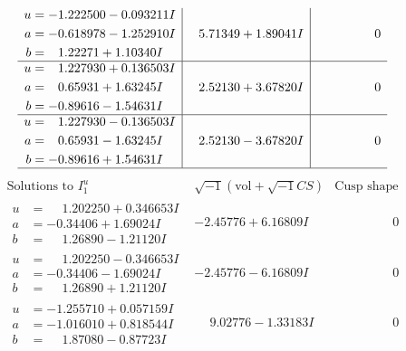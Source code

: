 \documentclass[1p]{elsarticle_modified}
\theoremstyle{definition}
\newcommand{\I}{\sqrt{-1}}
\begin{document}
$$\begin{array}{c|c|c}
\begin{aligned}
u &= -1.222500 - 0.093211 I \\
a &= -0.618978 - 1.252910 I \\
b &= \phantom{-}1.22271 + 1.10340 I\end{aligned}
 & \phantom{-}5.71349 + 1.89041 I & \phantom{-0.000000 } 0 \\ \hline\begin{aligned}
u &= \phantom{-}1.227930 + 0.136503 I \\
a &= \phantom{-}0.65931 + 1.63245 I \\
b &= -0.89616 - 1.54631 I\end{aligned}
 & \phantom{-}2.52130 + 3.67820 I & \phantom{-0.000000 } 0 \\ \hline\begin{aligned}
u &= \phantom{-}1.227930 - 0.136503 I \\
a &= \phantom{-}0.65931 - 1.63245 I \\
b &= -0.89616 + 1.54631 I\end{aligned}
 & \phantom{-}2.52130 - 3.67820 I & \phantom{-0.000000 } 0\\
 \hline 
 \end{array}$$\newpage$$\begin{array}{c|c|c}  
\text{Solutions to }I^u_{1}& \I (\text{vol} + \sqrt{-1}CS) & \text{Cusp shape}\\
 \hline 
\begin{aligned}
u &= \phantom{-}1.202250 + 0.346653 I \\
a &= -0.34406 + 1.69024 I \\
b &= \phantom{-}1.26890 - 1.21120 I\end{aligned}
 & -2.45776 + 6.16809 I & \phantom{-0.000000 } 0 \\ \hline\begin{aligned}
u &= \phantom{-}1.202250 - 0.346653 I \\
a &= -0.34406 - 1.69024 I \\
b &= \phantom{-}1.26890 + 1.21120 I\end{aligned}
 & -2.45776 - 6.16809 I & \phantom{-0.000000 } 0 \\ \hline\begin{aligned}
u &= -1.255710 + 0.057159 I \\
a &= -1.016010 + 0.818544 I \\
b &= \phantom{-}1.87080 - 0.87723 I\end{aligned}
 & \phantom{-}9.02776 - 1.33183 I & \phantom{-0.000000 } 0 \\ \hline\begin{aligned}

\end{aligned}
\end{array}$$
\end{document}
